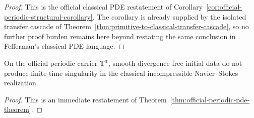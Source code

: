 \begin{proof}
This is the official classical PDE restatement of Corollary~\ref{cor:official-periodic-structural-corollary}. The corollary is already supplied by the isolated transfer cascade of Theorem~\ref{thm:primitive-to-classical-transfer-cascade}, so no further proof burden remains here beyond restating the same conclusion in Fefferman's classical PDE language.
\end{proof}

\begin{corollary}\label{cor:no-finite-time-blowup-official-carrier}
On the official periodic carrier $\mathbb{T}^3$, smooth divergence-free initial data do not produce finite-time
singularity in the classical incompressible Navier--Stokes realization.
\end{corollary}

\begin{proof}
This is an immediate restatement of Theorem~\ref{thm:official-periodic-pde-theorem}.
\end{proof}
